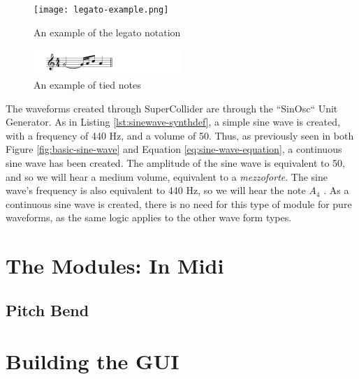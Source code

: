 \begin{figure}
  \centering
  \texttt{[image: legato-example.png]}
  \caption{An example of the legato notation}
  \label{fig:legato-example}
\end{figure}

\begin{figure}
  \centering
  \includegraphics[width=0.5\textwidth]{figures/tied-notes-example.png}
  \caption{An example of tied notes}
  \label{fig:tied-notes-example}
\end{figure}

The waveforms created through SuperCollider are through the ``SinOsc`` Unit Generator. As in Listing \ref{lst:sinewave-synthdef}, a simple sine wave is created, with a frequency of 440 Hz, and a volume of 50. Thus, as previously seen in both Figure \ref{fig:basic-sine-wave} and Equation \ref{eq:sine-wave-equation}, a continuous sine wave has been created. The amplitude of the sine wave is equivalent to 50, and so we will hear a medium volume, equivalent to a \textit{mezzoforte}. The sine wave's frequency is also equivalent to 440 Hz, so we will hear the note $A_4$ \cite{Suits_1998}. As a continuous sine wave is created, there is no need for this type of module for pure waveforms, as the same logic applies to the other wave form types. 


\section{The Modules: In Midi}\label{section:the-modules-midi}

\subsection{Pitch Bend}

\section{Building the GUI}\label{section:building-the-gui}